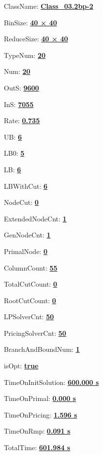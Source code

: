 \documentclass[11pt]{article}
\begin{document}
\pagestyle{empty}


ClassName: \underline{\textbf{Class_03.2bp-2}}
\par
BinSize: \underline{\textbf{40 × 40}}
\par
ReduceSize: \underline{\textbf{40 × 40}}
\par
TypeNum: \underline{\textbf{20}}
\par
Num: \underline{\textbf{20}}
\par
OutS: \underline{\textbf{9600}}
\par
InS: \underline{\textbf{7055}}
\par
Rate: \underline{\textbf{0.735}}
\par
UB: \underline{\textbf{6}}
\par
LB0: \underline{\textbf{5}}
\par
LB: \underline{\textbf{6}}
\par
LBWithCut: \underline{\textbf{6}}
\par
NodeCut: \underline{\textbf{0}}
\par
ExtendedNodeCnt: \underline{\textbf{1}}
\par
GenNodeCnt: \underline{\textbf{1}}
\par
PrimalNode: \underline{\textbf{0}}
\par
ColumnCount: \underline{\textbf{55}}
\par
TotalCutCount: \underline{\textbf{0}}
\par
RootCutCount: \underline{\textbf{0}}
\par
LPSolverCnt: \underline{\textbf{50}}
\par
PricingSolverCnt: \underline{\textbf{50}}
\par
BranchAndBoundNum: \underline{\textbf{1}}
\par
isOpt: \underline{\textbf{true}}
\par
TimeOnInitSolution: \underline{\textbf{600.000 s}}
\par
TimeOnPrimal: \underline{\textbf{0.000 s}}
\par
TimeOnPricing: \underline{\textbf{1.596 s}}
\par
TimeOnRmp: \underline{\textbf{0.091 s}}
\par
TotalTime: \underline{\textbf{601.984 s}}
\par
\newpage


\end{document}
